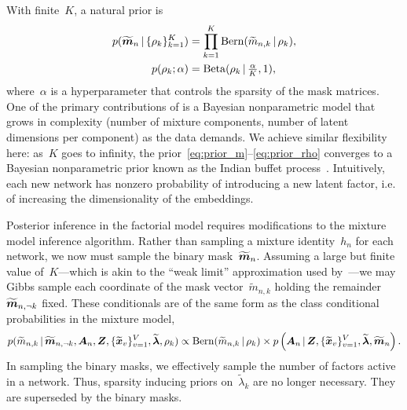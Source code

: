 With finite~$K$, a natural prior is
\begin{align}
  \label{eq:prior_m}
  p(\widetilde{\boldsymbol{m}}_n \, | \, \{\rho_k\}_{k=1}^K)
  &=\prod_{k=1}^K \mathrm{Bern}(\widetilde{m}_{n,k} \, | \, \rho_k), \\
  \label{eq:prior_rho}
  p(\rho_k; \alpha) &= \mathrm{Beta}(\rho_k \, | \, \tfrac{\alpha}{K}, 1), 
\end{align}
where~$\alpha$ is a hyperparameter that controls the sparsity of the
mask matrices.  One of the primary contributions of
\citet{durante2016nonparametric} is a Bayesian nonparametric model
that grows in complexity (number of mixture components, number of
latent dimensions per component) as the data demands.
We achieve similar flexibility here: as~$K$ goes to infinity, the 
prior~\eqref{eq:prior_m}--\eqref{eq:prior_rho} converges to a Bayesian
nonparametric prior known as the Indian buffet process~\citep{griffiths2005infinite}.
Intuitively, each new network has nonzero probability of introducing a
new latent factor, i.e. of increasing the dimensionality of the
embeddings.

Posterior inference in the factorial model requires
modifications to the mixture model inference algorithm. Rather than
sampling a mixture identity~$h_n$ for each network, we now must sample
the binary mask~$\widetilde{\boldsymbol{m}}_n$. Assuming a large but finite
value of~$K$---which is akin to the ``weak limit'' approximation used
by~\citet{durante2016nonparametric}---we may Gibbs sample each
coordinate of the mask vector~$\widetilde{m}_{n,k}$ holding the
remainder~$\widetilde{\boldsymbol{m}}_{n,\neg k}$ fixed.  These conditionals are
of the same form as the class conditional probabilities in the mixture
model,
\begin{multline}
  p(\widetilde{m}_{n,k} \, | \, \widetilde{\boldsymbol{m}}_{n, \neg k}, \boldsymbol{A}_n, \boldsymbol{Z},
  \{\widetilde{\boldsymbol{x}}_v\}_{v=1}^V, \widetilde{\boldsymbol{\lambda}},\rho_k) 
  \propto \mathrm{Bern}(\widetilde{m}_{n,k} \, | \, \rho_k) \times
  p\left(\boldsymbol{A}_n \, | \,
  \boldsymbol{Z}, \{\widetilde{\boldsymbol{x}}_v\}_{v=1}^V,
  \widetilde{\boldsymbol{\lambda}}, \widetilde{\boldsymbol{m}}_n \right).
\end{multline}
In sampling the binary masks, we effectively sample the number of
factors active in a network.  Thus, sparsity inducing priors
on~$\widetilde{\lambda}_k$ are no longer necessary. They are
superseded by the binary masks.

